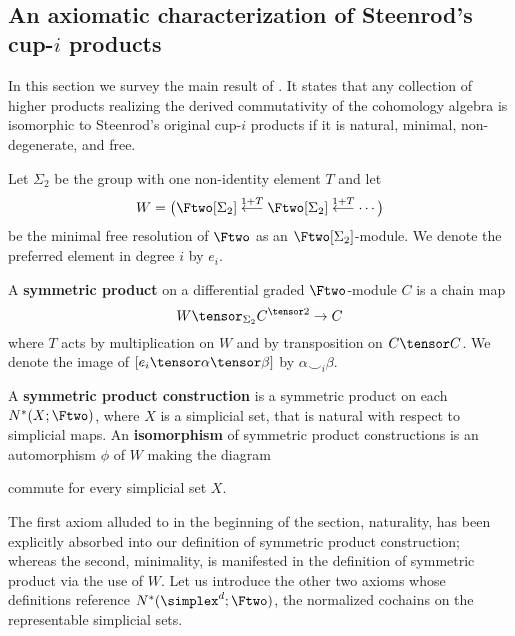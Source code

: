 \newpage
\ \\
\newpage

\subsection{An axiomatic characterization of Steenrod's cup-$i$ products}

In this section we survey the main result of \cite{medina2018axiomatic}.
It states that any collection of higher products realizing the derived commutativity of the cohomology algebra is isomorphic to Steenrod's original cup-$i$ products if it is natural, minimal, non-degenerate, and free.

Let $\Sigma_2$ be the group with one non-identity element $T$ and let
\begin{equation} \label{e:definition of W}
W = \big( \Ftwo[\Sigma_2] \stackrel{1+T}{\longleftarrow} \Ftwo[\Sigma_2] \stackrel{1+T}{\longleftarrow} \cdots \big)
\end{equation}
be the minimal free resolution of $\Ftwo$ as an $\Ftwo[\Sigma_2]$-module.
We denote the preferred element in degree $i$ by $e_i$.

A \textbf{symmetric product} on a differential graded $\Ftwo$-module $C$ is a chain map
\begin{equation*}
W \tensor_{\Sigma_2} C^{\tensor 2} \to C
\end{equation*}
where $T$ acts by multiplication on $W$ and by transposition on $C \tensor C$.
We denote the image of $[e_i \tensor \alpha \tensor \beta]$ by $\alpha \smallsmile_i \beta$.

A \textbf{symmetric product construction} is a symmetric product on each $N^*(X; \Ftwo)$, where $X$ is a simplicial set, that is natural with respect to simplicial maps.
An \textbf{isomorphism} of symmetric product constructions is an automorphism $\phi$ of $W$ making the diagram
\begin{center}
\end{center}
commute for every simplicial set $X$.

The first axiom alluded to in the beginning of the section, naturality, has been explicitly absorbed into our definition of symmetric product construction; whereas the second, minimality, is manifested in the definition of symmetric product via the use of $W$.
Let us introduce the other two axioms whose definitions reference $N^*(\simplex^d; \Ftwo)$, the normalized cochains on the representable simplicial sets.

